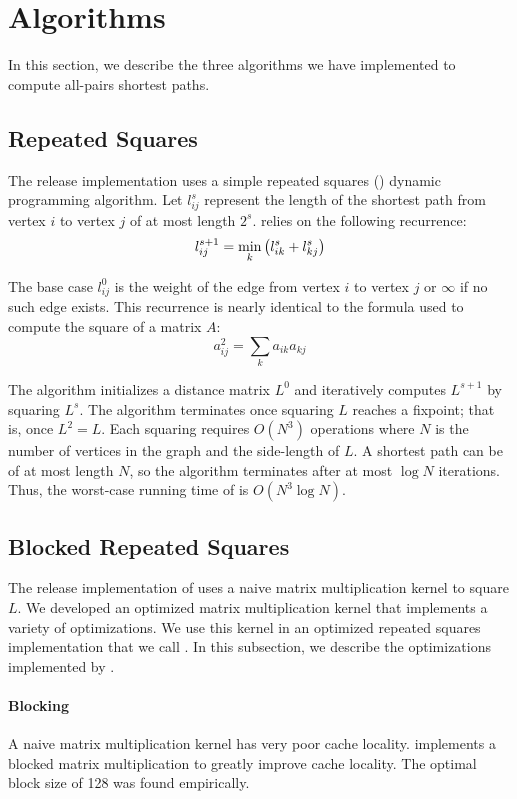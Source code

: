\section{Algorithms}\label{sec:algo}
In this section, we describe the three algorithms we have implemented to compute
all-pairs shortest paths.

\subsection{Repeated Squares}
The release implementation uses a simple repeated squares (\rs) dynamic
programming algorithm. Let $l_{ij}^s$ represent the length of the shortest path
from vertex $i$ to vertex $j$ of at most length $2^s$. \rs{} relies on the
following recurrence:
\[
  l_{ij}^{s+1} = \min_k \left({l_{ik}^s + l_{kj}^s}\right)
\]

The base case $l_{ij}^0$ is the weight of the edge from vertex $i$ to vertex
$j$ or $\infty$ if no such edge exists. This recurrence is nearly identical to
the formula used to compute the square of a matrix $A$:
\[
  a_{ij}^2 = \sum_k a_{ik} a_{kj}
\]

The algorithm initializes a distance matrix $L^0$ and iteratively computes
$L^{s+1}$ by squaring $L^s$. The algorithm terminates once squaring $L$ reaches
a fixpoint; that is, once $L^2 = L$. Each squaring requires $O(N^3)$ operations
where $N$ is the number of vertices in the graph and the side-length of $L$. A
shortest path can be of at most length $N$, so the algorithm terminates after
at most $\log N$ iterations. Thus, the worst-case running time of \rs{} is
$O(N^3 \log N)$.

\subsection{Blocked Repeated Squares}
The release implementation of \rs{} uses a naive matrix multiplication kernel
to square $L$. We developed an optimized matrix multiplication kernel that
implements a variety of optimizations. We use this kernel in an optimized
repeated squares implementation that we call \block{}. In this subsection, we
describe the optimizations implemented by \block{}.

\paragraph{Blocking}
A naive matrix multiplication kernel has very poor cache locality. \block{}
implements a blocked matrix multiplication to greatly improve cache locality.
The optimal block size of 128 was found empirically.


